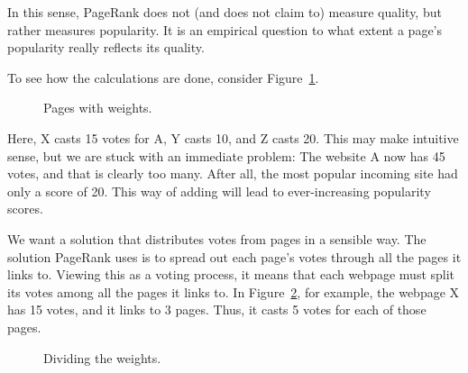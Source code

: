 In this sense, PageRank does not (and does not claim to) measure quality, but rather measures popularity.  It is an empirical question to what extent a page's popularity really reflects its quality. 

To see how the calculations are done, consider Figure~\ref{fig:link4}.  

\begin{figure}

\caption{Pages with weights.}
\label{fig:link4}
\end{figure}

Here, X casts 15 votes for A, Y casts 10, and Z casts 20.  This may
make intuitive sense, but we are stuck with an immediate problem: The
website A now has 45 votes, and that is clearly too many.  After all,
the most popular incoming site had only a score of 20.  This way of
adding will lead to ever-increasing popularity scores.

We want a solution that distributes votes from pages in a sensible
way.
The solution PageRank uses is to spread out each page's votes through
all the pages it links to.  Viewing this as a voting process, it means
that each webpage must split its votes among all the pages it links
to.  In Figure~\ref{fig:link2}, for example, the webpage X has 15
votes, and it links to 3 pages.  Thus, it casts 5 votes for each of
those pages.

\begin{figure}

\caption{Dividing the weights.}
\label{fig:link2}
\end{figure}

